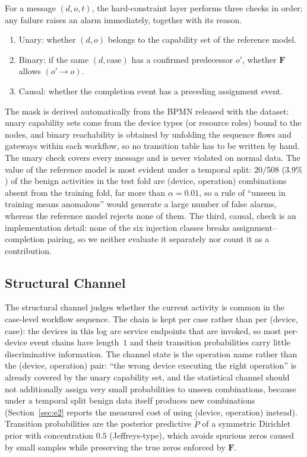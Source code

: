 \documentclass[manuscript,screen,review]{acmart}
\begin{document}
For a message $(d,o,t)$, the hard-constraint layer performs three checks in order; any failure raises an alarm immediately, together with its reason.
\begin{enumerate}[leftmargin=1.4em,itemsep=2pt]
\item Unary: whether $(d,o)$ belongs to the capability set of the reference model.
\item Binary: if the same $(d,\mathrm{case})$ has a confirmed predecessor $o'$, whether $\mathbf F$ allows $(o'\to o)$.
\item Causal: whether the completion event has a preceding assignment event.
\end{enumerate}
The mask is derived automatically from the {BPMN} released with the dataset: unary capability sets come from the device types (or resource roles) bound to the nodes, and binary reachability is obtained by unfolding the sequence flows and gateways within each workflow, so no transition table has to be written by hand. The unary check covers every message and is never violated on normal data. The value of the reference model is most evident under a temporal split: $20/508$ ($3.9\%$) of the benign activities in the test fold are (device, operation) combinations absent from the training fold, far more than $\alpha=0.01$, so a rule of ``unseen in training means anomalous'' would generate a large number of false alarms, whereas the reference model rejects none of them. The third, causal, check is an implementation detail: none of the six injection classes breaks assignment--completion pairing, so we neither evaluate it separately nor count it as a contribution.

\subsection{Structural Channel}
\label{sec:struct}

The structural channel judges whether the current activity is common in the case-level workflow sequence. The chain is kept per case rather than per (device, case): the devices in this log are service endpoints that are invoked, so most per-device event chains have length~$1$ and their transition probabilities carry little discriminative information. The channel state is the operation name rather than the (device, operation) pair: ``the wrong device executing the right operation'' is already covered by the unary capability set, and the statistical channel should not additionally assign very small probabilities to unseen combinations, because under a temporal split benign data itself produces new combinations (Section~\ref{sec:e2} reports the measured cost of using (device, operation) instead). Transition probabilities are the posterior predictive $\tilde P$ of a symmetric {Dirichlet} prior with concentration $0.5$ ({Jeffreys}-type), which avoids spurious zeros caused by small samples while preserving the true zeros enforced by $\mathbf F$.
\end{document}
